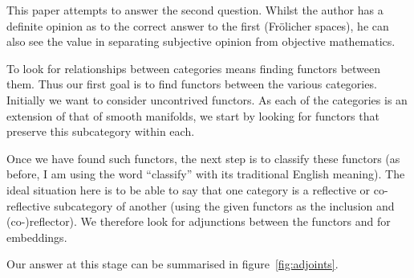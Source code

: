 \documentclass[%
12pt,%
arxiv,%
defaults
]{myclass}
\begin{document}
This paper attempts to answer the second question.
Whilst the author has a definite opinion as to the correct answer to the first (Fr\"olicher spaces), he can also see the value in separating subjective opinion from objective mathematics.

\medskip

To look for relationships between categories means finding functors between them.
Thus our first goal is to find functors between the various categories.
Initially we want to consider uncontrived functors.
As each of the categories is an extension of that of smooth manifolds, we start by looking for functors that preserve this subcategory within each.

Once we have found such functors, the next step is to classify these functors (as before, I am using the word ``classify'' with its traditional English meaning).
The ideal situation here is to be able to say that one category is a reflective or co\hyp{}reflective subcategory of another (using the given functors as the inclusion and (co\hyp{})reflector).
We therefore look for adjunctions between the functors and for embeddings.

Our answer at this stage can be summarised in figure~\ref{fig:adjoints}.
\end{document}
